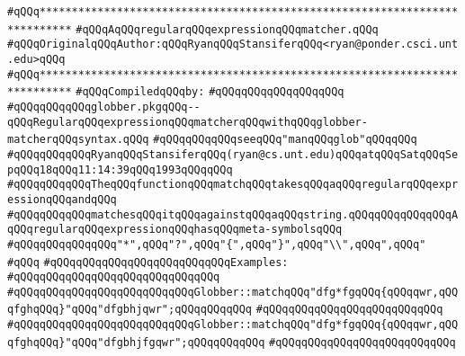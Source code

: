 \label{src/lib/tk/src/toolkit/regExp/globber.pkg}
\verb|#qQQq***************************************************************************|\newline
\verb|#qQQqAqQQqregularqQQqexpressionqQQqmatcher.qQQq|\newline
\verb|#qQQqOriginalqQQqAuthor:qQQqRyanqQQqStansiferqQQq<ryan@ponder.csci.unt.edu>qQQq|\newline
\verb|#qQQq***************************************************************************|\newline
\newline
\verb|#qQQqCompiledqQQqby:|\newline
\verb|#qQQqqQQqqQQqqQQqqQQq|\newline
\newline
\verb|#qQQqqQQqqQQqglobber.pkgqQQq--qQQqRegularqQQqexpressionqQQqmatcherqQQqwithqQQqglobber-matcherqQQqsyntax.qQQq|\newline
\verb|#qQQqqQQqqQQqseeqQQq"manqQQqglob"qQQqqQQq|\newline
\verb|#qQQqqQQqqQQqRyanqQQqStansiferqQQq(ryan@cs.unt.edu)qQQqatqQQqSatqQQqSepqQQq18qQQq11:14:39qQQq1993qQQqqQQq|\newline
\newline
\verb|#qQQqqQQqqQQqTheqQQqfunctionqQQqmatchqQQqtakesqQQqaqQQqregularqQQqexpressionqQQqandqQQq|\newline
\verb|#qQQqqQQqqQQqmatchesqQQqitqQQqagainstqQQqaqQQqstring.qQQqqQQqqQQqqQQqAqQQqregularqQQqexpressionqQQqhasqQQqmeta-symbolsqQQq|\newline
\verb|#qQQqqQQqqQQqqQQq"*",qQQq"?",qQQq"{",qQQq"}",qQQq"\\",qQQq",qQQq"|\newline
\verb|#qQQq|\newline
\verb|#qQQqqQQqqQQqqQQqqQQqqQQqqQQqExamples:|\newline
\verb|#qQQqqQQqqQQqqQQqqQQqqQQqqQQqqQQq|\newline
\verb|#qQQqqQQqqQQqqQQqqQQqqQQqqQQqGlobber::matchqQQq"dfg*fgqQQq{qQQqqwr,qQQqfghqQQq}"qQQq"dfgbhjqwr";qQQqqQQqqQQq|\newline
\verb|#qQQqqQQqqQQqqQQqqQQqqQQqqQQq|\newline
\verb|#qQQqqQQqqQQqqQQqqQQqqQQqqQQqGlobber::matchqQQq"dfg*fgqQQq{qQQqqwr,qQQqfghqQQq}"qQQq"dfgbhjfgqwr";qQQqqQQqqQQq|\newline
\verb|#qQQqqQQqqQQqqQQqqQQqqQQqqQQq|\newline
